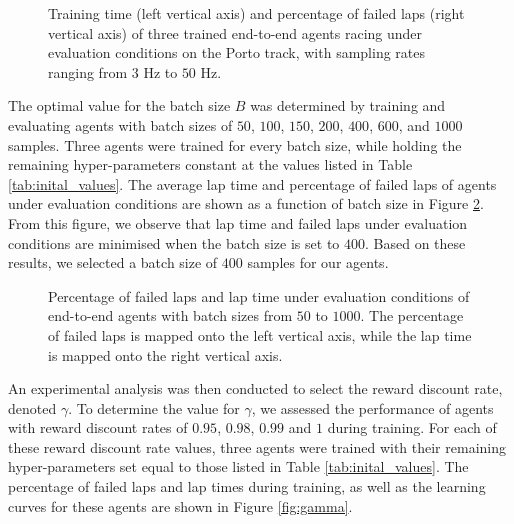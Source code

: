 \begin{figure}[htb!]
    \centering
    
    \caption[Training time and percentage failed laps under evaluation conditions of end-to-end agents with various sampling rates]{Training time (left vertical axis) and percentage of failed laps (right vertical axis) of three trained end-to-end agents racing under evaluation conditions on the Porto track, with sampling rates ranging from $3$ Hz to $50$ Hz.}
    \label{fig:f_agent}
\end{figure}

The optimal value for the batch size $B$ was determined by training and evaluating agents with batch sizes of $50$, $100$, $150$, $200$, $400$, $600$, and $1000$ samples.
Three agents were trained for every batch size, while holding the remaining hyper-parameters constant at the values listed in Table \ref{tab:inital_values}.
The average lap time and percentage of failed laps of agents under evaluation conditions are shown as a function of batch size in Figure \ref{fig:batch_size}.
From this figure, we observe that lap time and failed laps under evaluation conditions are minimised when the batch size is set to $400$.
Based on these results, we selected a batch size of $400$ samples for our agents.

\begin{figure}[htb!]
    \centering
    
    \caption[Percentage failed laps and lap time under evaluation conditions of end-to-end agents with various batch sizes]{Percentage of failed laps and lap time under evaluation conditions of end-to-end agents with batch sizes from $50$ to $1000$. The percentage of failed laps is mapped onto the left vertical axis, while the lap time is mapped onto the right vertical axis.}
    \label{fig:batch_size}
\end{figure}


An experimental analysis was then conducted to select the reward discount rate, denoted $\gamma$. 
To determine the value for $\gamma$, we assessed the performance of agents with reward discount rates of $0.95$, $0.98$, $0.99$ and $1$ during training.
For each of these reward discount rate values, three agents were trained with their remaining hyper-parameters set equal to those listed in Table \ref{tab:inital_values}.
The percentage of failed laps and lap times during training, as well as the learning curves for these agents are shown in Figure \ref{fig:gamma}.


